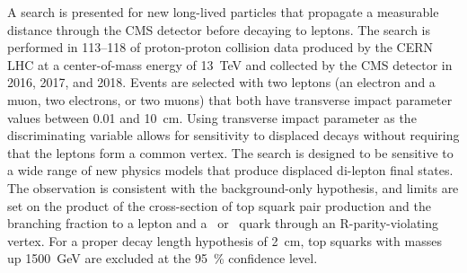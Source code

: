 
A search is presented for new long-lived particles that propagate a measurable distance through the CMS detector before decaying to leptons. The search is performed in 113--\SI{118}{\invfb} of proton-proton collision data produced by the CERN LHC at a center-of-mass energy of \SI{13}{\TeV} and collected by the CMS detector in 2016, 2017, and 2018. Events are selected with two leptons (an electron and a muon, two electrons, or two muons) that both have transverse impact parameter values between 0.01 and \SI{10}{\cm}. Using transverse impact parameter as the discriminating variable allows for sensitivity to displaced decays without requiring that the leptons form a common vertex. The search is designed to be sensitive to a wide range of new physics models that produce displaced di-lepton final states. The observation is consistent with the background-only hypothesis, and limits are set on the product of the cross-section of top squark pair production and the branching fraction to a lepton and a \cPqb\ or \cPqd\ quark through an R-parity-violating vertex. For a proper decay length hypothesis of \SI{2}{\cm}, top squarks with masses up \SI{1500}{\GeV} are excluded at the \SI{95}{\percent} confidence level.

